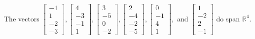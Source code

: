 \begin{exercise}
\begin{exerciseStatement}
  \end{exerciseStatement}
  \begin{exerciseAnswer}
   The vectors \(\left[\begin{array}{r}
-1 \\
1 \\
-2 \\
-3
\end{array}\right] , \left[\begin{array}{r}
4 \\
-3 \\
-1 \\
1
\end{array}\right] , \left[\begin{array}{r}
3 \\
-5 \\
0 \\
-2
\end{array}\right] , \left[\begin{array}{r}
2 \\
-4 \\
-2 \\
-5
\end{array}\right] , \left[\begin{array}{r}
0 \\
-1 \\
4 \\
1
\end{array}\right] , \text{ and } \left[\begin{array}{r}
1 \\
-2 \\
2 \\
-1
\end{array}\right]\) 
  	 do  
	span \(\mathbb{R}^4\).
  


  \end{exerciseAnswer}
\end{exercise}